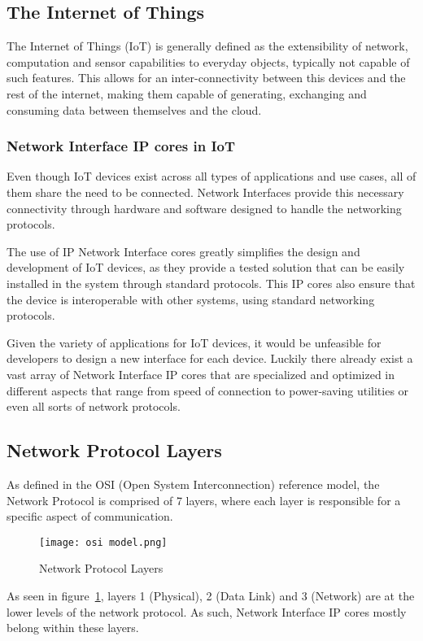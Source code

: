 \subsection{The Internet of Things}
The Internet of Things (IoT) is generally defined as the
extensibility of network, computation and sensor capabilities to everyday
objects, typically not capable of such features. This allows for an
inter-connectivity between this devices and the rest of the internet, making
them capable of generating, exchanging and consuming data between themselves
and the cloud.

\subsubsection{Network Interface IP cores in IoT}
Even though IoT devices exist across all types of applications
and use cases, all of them share the need to be connected. Network Interfaces
provide this necessary connectivity through hardware and software designed to
handle the networking protocols.

    The use of IP Network Interface cores greatly simplifies the
design and development of IoT devices, as they provide a tested solution that
can be easily installed in the system through standard protocols. This IP
cores also ensure that the device is interoperable with other systems, using
standard networking protocols.

    Given the variety of applications for IoT devices, it would be
unfeasible for developers to design a new interface for each device. Luckily
there already exist a vast array of Network Interface IP cores that are
specialized and optimized in different aspects that range from speed of
connection to power-saving utilities or even all sorts of network protocols.

\subsection{Network Protocol Layers}
As defined in the OSI (Open System Interconnection) reference
model, the Network Protocol is comprised of 7 layers, where each layer is
responsible for a specific aspect of communication.

\begin{figure}[H]
    \centering
    \texttt{[image: osi model.png]}
    \caption{Network Protocol Layers}
    \label{fig:osi_model}
\end{figure}

As seen in figure~\ref{fig:osi_model}, layers 1 (Physical), 2 (Data Link) and 3
(Network) are at the lower levels of the network protocol. As such, Network
Interface IP cores mostly belong within these layers.

